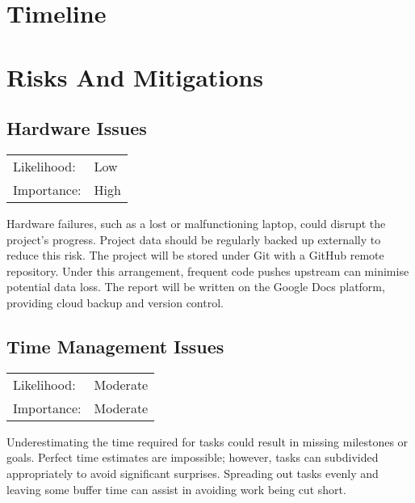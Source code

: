 \documentclass[]{final_report}
\begin{document}

\chapter{Timeline}

\chapter{Risks And Mitigations}

\section{Hardware Issues}

\begin{center}
    \begin{tabular}{l l  }
    Likelihood: & Low \\
    Importance: & High \\
    \end{tabular}
  \end{center}

Hardware failures, such as a lost or malfunctioning laptop, could disrupt the project's progress. Project data should be regularly backed up externally to reduce this risk. The project will be stored under Git with a GitHub remote repository. Under this arrangement, frequent code pushes upstream can minimise potential data loss. The report will be written on the Google Docs platform, providing cloud backup and version control. 


\section{Time Management Issues}

\begin{center}
    \begin{tabular}{l l  }
    Likelihood: & Moderate \\
    Importance: & Moderate \\
    \end{tabular}
  \end{center}

Underestimating the time required for tasks could result in missing milestones or goals. Perfect time estimates are impossible; however, tasks can subdivided appropriately to avoid significant surprises. Spreading out tasks evenly and leaving some buffer time can assist in avoiding work being cut short. 
\end{document}
